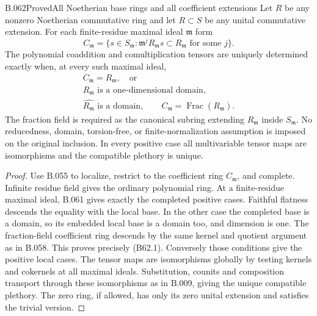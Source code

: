 \begin{saresult}{B.062}{Proved}{All Noetherian base rings and all coefficient extensions}
Let $R$ be any nonzero Noetherian commutative ring
and let $R\subset S$ be any unital commutative
extension. For each finite-residue maximal ideal
$\mathfrak m$ form
\[
 C_{\mathfrak m}
   =\{s\in S_{\mathfrak m}:\mathfrak m^jR_{\mathfrak m}s
          \subset R_{\mathfrak m}\text{ for some }j\}.
\]
The polynomial coaddition and comultiplication
tensors are uniquely determined exactly when,
at every such maximal ideal,
\[
\begin{gathered}
 C_{\mathfrak m}=R_{\mathfrak m},\quad\text{or}\\
 R_{\mathfrak m}\text{ is a one-dimensional domain},\\
 \widehat{R_{\mathfrak m}}\text{ is a domain},\qquad
 C_{\mathfrak m}=\operatorname{Frac}(R_{\mathfrak m}).     \tag{B62.1}
\end{gathered}
\]
The fraction field is required as the canonical
subring extending $R_{\mathfrak m}$ inside
$S_{\mathfrak m}$. No reducedness, domain,
torsion-free, or finite-normalization assumption
is imposed on the original inclusion. In every
positive case all multivariable tensor maps
are isomorphisms and the compatible plethory
is unique.
\end{saresult}
\begin{proof}
Use B.055 to localize, restrict to the coefficient
ring $C_{\mathfrak m}$, and complete. Infinite
residue field gives the ordinary polynomial ring.
At a finite-residue maximal ideal, B.061 gives
exactly the completed positive cases.
Faithful flatness descends the equality with the
local base. In the other case the completed
base is a domain, so its embedded local base
is a domain too, and dimension is one.
The fraction-field coefficient ring descends
by the same kernel and quotient argument as
in B.058. This proves precisely (B62.1).
Conversely those conditions give the positive
local cases. The tensor maps are isomorphisms
globally by testing kernels and cokernels at
all maximal ideals. Substitution, counits and
composition transport through these isomorphisms
as in B.009, giving the unique compatible plethory.
The zero ring, if allowed, has only its zero
unital extension and satisfies the trivial version.
\end{proof}
